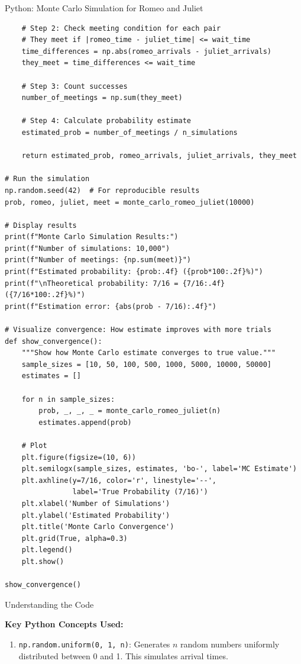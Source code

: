 \begin{itemize}
\begin{codeblock}{Python: Monte Carlo Simulation for Romeo and Juliet}
\begin{lstlisting}
    # Step 2: Check meeting condition for each pair
    # They meet if |romeo_time - juliet_time| <= wait_time
    time_differences = np.abs(romeo_arrivals - juliet_arrivals)
    they_meet = time_differences <= wait_time

    # Step 3: Count successes
    number_of_meetings = np.sum(they_meet)

    # Step 4: Calculate probability estimate
    estimated_prob = number_of_meetings / n_simulations

    return estimated_prob, romeo_arrivals, juliet_arrivals, they_meet

# Run the simulation
np.random.seed(42)  # For reproducible results
prob, romeo, juliet, meet = monte_carlo_romeo_juliet(10000)

# Display results
print(f"Monte Carlo Simulation Results:")
print(f"Number of simulations: 10,000")
print(f"Number of meetings: {np.sum(meet)}")
print(f"Estimated probability: {prob:.4f} ({prob*100:.2f}%)")
print(f"\nTheoretical probability: 7/16 = {7/16:.4f} ({7/16*100:.2f}%)")
print(f"Estimation error: {abs(prob - 7/16):.4f}")

# Visualize convergence: How estimate improves with more trials
def show_convergence():
    """Show how Monte Carlo estimate converges to true value."""
    sample_sizes = [10, 50, 100, 500, 1000, 5000, 10000, 50000]
    estimates = []

    for n in sample_sizes:
        prob, _, _, _ = monte_carlo_romeo_juliet(n)
        estimates.append(prob)

    # Plot
    plt.figure(figsize=(10, 6))
    plt.semilogx(sample_sizes, estimates, 'bo-', label='MC Estimate')
    plt.axhline(y=7/16, color='r', linestyle='--',
                label='True Probability (7/16)')
    plt.xlabel('Number of Simulations')
    plt.ylabel('Estimated Probability')
    plt.title('Monte Carlo Convergence')
    plt.grid(True, alpha=0.3)
    plt.legend()
    plt.show()

show_convergence()
\end{lstlisting}
\end{codeblock}

\begin{keyconceptboxbreak}{Understanding the Code}

\textbf{Key Python Concepts Used:}

\begin{enumerate}
    \item \texttt{np.random.uniform(0, 1, n)}: Generates $n$ random numbers uniformly distributed between 0 and 1. This simulates arrival times.


\end{enumerate}
\end{keyconceptboxbreak}
\end{itemize}

